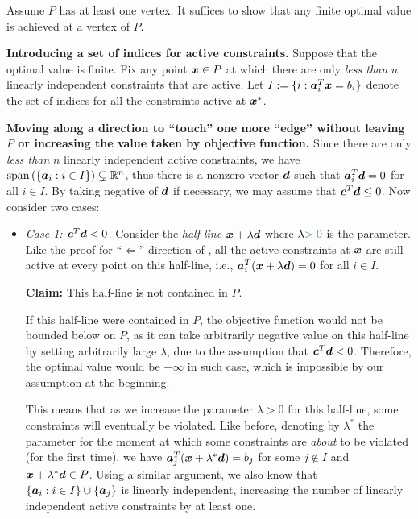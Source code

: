 \begin{enumerate}
\begin{pf}
Assume \(P\) has at least one vertex. It suffices to show that any finite
optimal value is achieved at a vertex of \(P\).

\textbf{Introducing a set of indices for active constraints.} Suppose that the
optimal value is finite. Fix any point \(\bm{x}\in P\) at which there are
only \emph{less than} \(n\) linearly independent constraints that are active.
Let \(I:=\{i:\bm{a}_i^{T}\bm{x}=b_i\}\) denote the set of indices for all
the constraints active at \(\bm{x}^*\).

\textbf{Moving along a direction to ``touch'' one more ``edge'' without leaving
\(P\) or increasing the value taken by objective function.}
Since there are only \emph{less than} \(n\) linearly independent active
constraints, we have \(\operatorname{span}\left(\{\bm{a}_i:i\in I\}\right)\subsetneq\mathbb{R}^n \), thus there
is a nonzero vector \(\bm{d}\) such that \(\bm{a}_i^{T}\bm{d}=0\) for all
\(i\in I\). By taking negative of \(\bm{d}\) if necessary, we may assume that
\(\bm{c}^{T}\bm{d}\le 0\). Now consider two cases:
\begin{itemize}
\item \emph{Case 1: \(\bm{c}^{T}\bm{d}<0\).} Consider the \emph{half-line}
\(\bm{x}+\lambda\bm{d}\) where \(\lambda\gc{>0}\) is the parameter.  Like
the proof for ``\(\Leftarrow\)'' direction of ,
all the active constraints at \(\bm{x}\) are still active at every point on
this half-line, i.e., \(\bm{a}_i^{T}(\bm{x}+\lambda\bm{d})=0\) for all
\(i\in I\).

\textbf{Claim:} This half-line is not contained in \(P\).

\begin{pf}
If this half-line were contained in \(P\), the objective function
would not be bounded below on \(P\), as it can take arbitrarily negative value
on this half-line by setting arbitrarily large \(\lambda\), due to the
assumption that \(\bm{c}^{T}\bm{d}<0\). Therefore, the optimal value would
be \(-\infty\) in such case, which is impossible by our assumption at the beginning.
\end{pf}

This means that as we increase the parameter \(\lambda>0\) for this half-line,
some constraints will eventually be violated. Like before, denoting by
\(\lambda^*\) the parameter for the moment at which some constraints are \emph{about}
to be violated (for the first time), we have
\(\bm{a}_j^{T}(\bm{x}+\lambda^*\bm{d})=b_j\) for some \(j\notin I\) and
\(\bm{x}+\lambda^*\bm{d}\in P\). Using a similar argument, we also know
that \(\{\bm{a}_{i}:i\in I\}\cup\{\bm{a}_j\}\) is linearly independent,
increasing the number of linearly independent active constraints by at least
one.


\end{itemize}
\end{pf}
\end{enumerate}
